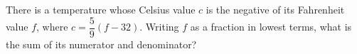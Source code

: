 There is a temperature whose Celsius value $c$ is the negative of its Fahrenheit value $f$, where $c=\dfrac59(f-32)$. Writing $f$ as a fraction in lowest terms, what is the sum of its numerator and denominator?
